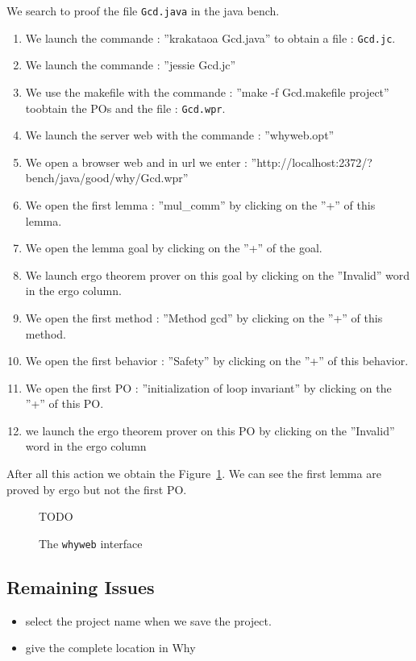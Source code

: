 \documentclass[a4paper,12pt]{report}
\begin{document}
\begin{example}
We search to proof the file \texttt{Gcd.java} in the java bench. 
\begin{enumerate}
\item We launch the commande : ''krakataoa Gcd.java'' to obtain a file : \texttt{Gcd.jc}.
\item We launch the commande : ''jessie Gcd.jc''
\item We use the makefile with the commande : ''make -f Gcd.makefile
project'' toobtain the POs and the file : \texttt{Gcd.wpr}.
\item We launch the server web with the commande : ''whyweb.opt''
\item We open a browser web and in url we enter :
''http://localhost:2372/?bench/java/good/why/Gcd.wpr''
\item We open the first lemma : ''mul\_comm'' by clicking on the ''+'' of this lemma.
\item We open the lemma goal by clicking on the ''+'' of the goal.
\item We launch ergo theorem prover on this goal by clicking on the
  ''Invalid'' word in the ergo column.
\item We open the first method : ''Method gcd'' by clicking on the
  ''+'' of this method.
\item We open the first behavior : ''Safety'' by clicking on the ''+'' of this behavior.
\item We open the first PO : ''initialization of loop invariant'' by
  clicking on the ''+'' of this PO.
\item we launch the ergo theorem prover on this PO by clicking on the
  ''Invalid'' word in the ergo column
\end{enumerate}
After all this action we obtain the Figure~\ref{fig:whyweb}. We can
see the first lemma are proved by ergo but not the first PO.


\end{example}
\begin{figure}
  \centering
  TODO %
  \caption{The \texttt{whyweb} interface}
  \label{fig:whyweb}
\end{figure}

\subsection{Remaining Issues}
\begin{itemize}
\item select the project name when we save the project.
\item give the complete location in Why
\end{itemize}
\end{document}
